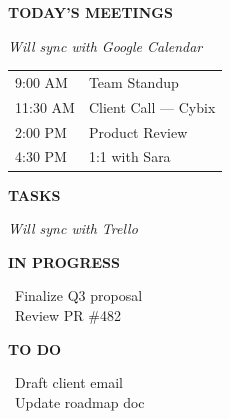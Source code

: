 \documentclass[10pt]{article}
\newcommand{\headlinefont}{\fontfamily{ppl}\selectfont} %
\newcommand{\sansfont}{\fontfamily{\sfdefault}\selectfont} %
\newcommand{\hrulethin}{\noindent{\color{hairline}\rule{\linewidth}{0.5pt}}\par}
\begin{document}
\begin{minipage}[t]{0.34\linewidth}\vspace{0pt}
  \begin{tcolorbox}[colback=boxfill,colframe=ink,boxrule=0.5pt,arc=0pt,
                     left=3mm,right=3mm,top=2mm,bottom=2mm]
    {\headlinefont\bfseries\large TODAY'S MEETINGS}\par
    \hrulethin\par\smallskip
    {\sansfont\footnotesize\itshape\color{captiongray} Will sync with Google Calendar}\par
    \smallskip
    {\sansfont\footnotesize
    \begin{tabularx}{\linewidth}{@{}l X@{}}
      9:00 AM  & Team Standup \\
      11:30 AM & Client Call --- Cybix \\
      2:00 PM  & Product Review \\
      4:30 PM  & 1:1 with Sara \\
    \end{tabularx}}
  \end{tcolorbox}

  \vspace{3mm}
  \begin{tcolorbox}[colback=boxfillwarm,colframe=masthead red,boxrule=0.7pt,arc=0pt,
                     left=3mm,right=3mm,top=2mm,bottom=2mm]
    {\sansfont\footnotesize\bfseries\color{masthead red} TASKS}\par
    \hrulethin\par\smallskip
    {\sansfont\footnotesize\itshape\color{captiongray} Will sync with Trello}\par
    \smallskip
    {\sansfont\footnotesize\bfseries IN PROGRESS}\par
    {\sansfont\footnotesize
    \textbullet\ Finalize Q3 proposal\\
    \textbullet\ Review PR \#482}\par
    \smallskip
    {\sansfont\footnotesize\bfseries TO DO}\par
    {\sansfont\footnotesize
    \textbullet\ Draft client email\\
    \textbullet\ Update roadmap doc}
  \end{tcolorbox}


\end{minipage}
\end{document}
